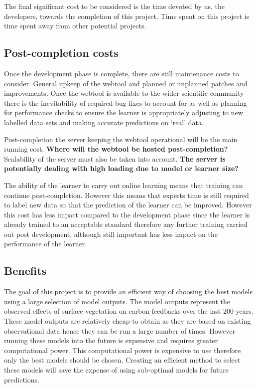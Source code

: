\documentclass[11pt]{article} %
\numberwithin{equation}{section}
\begin{document}
\quad The final significant cost to be considered is the time devoted by us, the developers, towards the completion of this project. Time spent on this project is time spent away from other potential projects.

\subsection{Post-completion costs}
\quad Once the development phase is complete, there are still maintenance costs to consider. General upkeep of the webtool and planned or unplanned patches and improvements. Once the webtool is available to the wider scientific community there is the inevitability of required bug fixes to account for as well as planning for performance checks to ensure the learner is appropriately adjusting to new labelled data sets and making accurate predictions on ‘real’ data.\par

\quad Post-completion the server keeping the webtool operational will be the main running cost. \textbf{Where will the webtool be hosted post-completion?} Scalability of the server must also be taken into account. \textbf{The server is potentially dealing with high loading due to model or learner size?}\par

\quad The ability of the learner to carry out online learning means that training can continue post-completion. However this means that experts time is still required to label new data so that the prediction of the learner can be improved. However this cost has less impact compared to the development phase since the learner is already trained to an acceptable standard therefore any further training carried out post development, although still important has less impact on the performance of the learner.\par

\subsection{Benefits}
\quad The goal of this project is to provide an efficient way of choosing the best models using a large selection of model outputs. The model outputs represent the observed effects of surface vegetation on carbon feedbacks over the last 200 years. These model outputs are relatively cheap to obtain as they are based on existing observational data hence they can be run a large number of times. However running these models into the future is expensive and requires greater computational power. This computational power is expensive to use therefore only the best models should be chosen. Creating an efficient method to select these models will save the expense of using sub-optimal models for future predictions.\par
\end{document}
